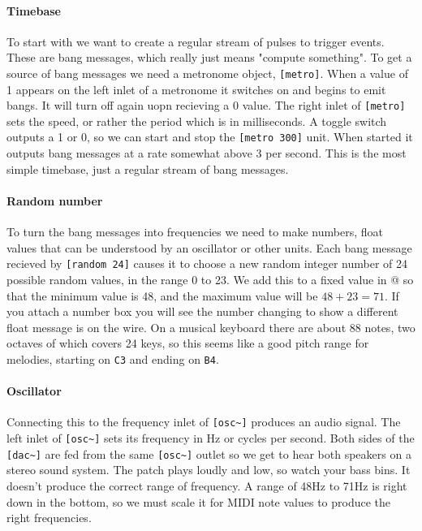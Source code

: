 \paragraph{Timebase}
To start with we want to create a regular stream of pulses to trigger events. These are bang messages, which really just means "compute something". To get a source of bang messages we need a metronome object, \verb+[metro]+. When a value of 1 appears on the left inlet of a metronome it switches on and begins to emit bangs. It will turn off again uopn recieving a 0 value. The right inlet of \verb+[metro]+ sets the speed, or rather the period which is in milliseconds. A toggle switch outputs a 1 or 0, so we can start and stop the \verb+[metro 300]+ unit. When started it outputs bang messages at a rate somewhat above 3 per second. This is the most simple timebase, just a regular stream of bang messages. 

\paragraph{Random number}
To turn the bang messages into frequencies we need to make numbers, float values that can be understood by an oscillator or other units. Each bang message recieved by \verb+[random 24]+ causes it to choose a new random integer number of 24 possible random values, in the range 0 to 23. We add this to a fixed value in \verb@[+ 48]@ so that the minimum value is 48, and the maximum value will be $48 + 23 = 71$. If you attach a number box you will see the number changing to show a different float message is on the wire. On a musical keyboard there are about 88 notes, two octaves of which covers 24 keys, so this seems like a good pitch range for melodies, starting on \verb+C3+ and ending on \verb+B4+.  


\paragraph{Oscillator}
Connecting this to the frequency inlet of \verb+[osc~]+ produces an audio signal. The left inlet
of \verb+[osc~]+ sets its frequency in Hz or cycles per second. Both sides of
the \verb+[dac~]+ are fed from the same \verb+[osc~]+ outlet so we get to hear both speakers on 
a stereo sound system. The patch plays loudly and low,
so watch your bass bins. It doesn't produce the correct range of frequency.  A range of 48Hz to 71Hz is right 
down in the bottom, so we must scale it for MIDI note values to produce the right frequencies. 

   